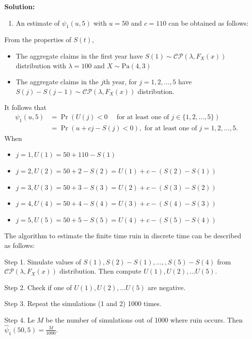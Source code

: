 \documentclass[landscape, 20pt]{extreport}
\providecommand{\tightlist}{%
  \setlength{\itemsep}{0pt}\setlength{\parskip}{0pt}}
\theoremstyle{definition}
\theoremstyle{definition}
\theoremstyle{definition}
\theoremstyle{definition}
\theoremstyle{remark}
\begin{document}
\textbf{Solution:}

\begin{enumerate}
\def\labelenumi{\arabic{enumi}.}
\tightlist
\item
  An estimate of \(\psi_1(u,5)\) with \(u = 50\) and \(c =110\) can be obtained as follows:
\end{enumerate}

From the properties of \(S(t)\),

\begin{itemize}
\item
  The aggregate claims in
  the first year have \(S(1) \sim \mathcal{CP}(\lambda, F_X(x))\) distribution with \(\lambda = 100\) and \(X \sim \text{Pa}(4,3)\)
\item
  The aggregate
  claims in the \(j\)th year, for \(j = 1,2, \ldots, 5\) have \(S(j) - S(j-1) \sim \mathcal{CP}(\lambda, F_X(x))\) distribution.
\end{itemize}

It follows that
\begin{align}
\psi_1(u,5) &= \Pr(U(j) < 0 \quad \text{ for at least one of } j \in \{1,2, \ldots, 5\}) \\
&= \Pr(u + cj - S(j) < 0 ), \text{ for at least one of } j = 1,2, \ldots, 5.
\end{align}
When

\begin{itemize}
\item
  \(j = 1, U(1) = 50 + 110 - S(1)\)
\item
  \(j = 2, U(2) = 50 + 2 - S(2) = U(1) + c - (S(2) - S(1))\)
\item
  \(j = 3, U(3) = 50 + 3 - S(3) = U(2) + c - (S(3) - S(2))\)
\item
  \(j = 4, U(4) = 50 + 4 - S(4) = U(3) + c - (S(4) - S(3))\)
\item
  \(j = 5, U(5) = 50 + 5 - S(5) = U(4) + c - (S(5) - S(4))\)
\end{itemize}

The algorithm to estimate the finite time ruin in discrete time can be described as follows:

Step 1. Simulate values of \(S(1), S(2) - S(1), \ldots, , S(5) - S(4)\) from \(\mathcal{CP}(\lambda, F_X(x))\) distribution. Then compute \(U(1), U(2), \ldots U(5)\).

Step 2. Check if one of \(U(1), U(2), \ldots U(5)\) are negative.

Step 3. Repeat the simulations (1 and 2) 1000 times.

Step 4. Le \(M\) be the number of simulations out of 1000 where ruin occurs. Then \(\hat{\psi}_1(50, 5) = \frac{M}{1000}.\)
\end{document}
